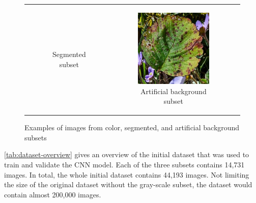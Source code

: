 \documentclass{BachelorBUI}
\begin{document}
\begin{figure}[!h]
\begin{tabular}{ccc}
\begin{subfigure}[t]{0.30\textwidth}
                    \caption{\centering Segmented subset}
                \end{subfigure} &
                \begin{subfigure}[t]{0.30\textwidth}
                    \centering
                    \includegraphics[width=\textwidth]{artificial_strawberry_leaf_scorch.jpg}
                    \caption{\centering Artificial background subset}
                \end{subfigure} \\
            \end{tabular}
            \caption{\centering Examples of images from color, segmented, and artificial background subsets}
            \label{fig:dataset-image-examples}
        \end{figure}

        \autoref{tab:dataset-overview} gives an overview of the initial dataset that was used to train and validate the CNN model. Each of the three subsets contains 14,731 images. In total, the whole initial dataset contains 44,193 images. Not limiting the size of the original dataset without the gray-scale subset, the dataset would contain almost 200,000 images.
\end{document}
